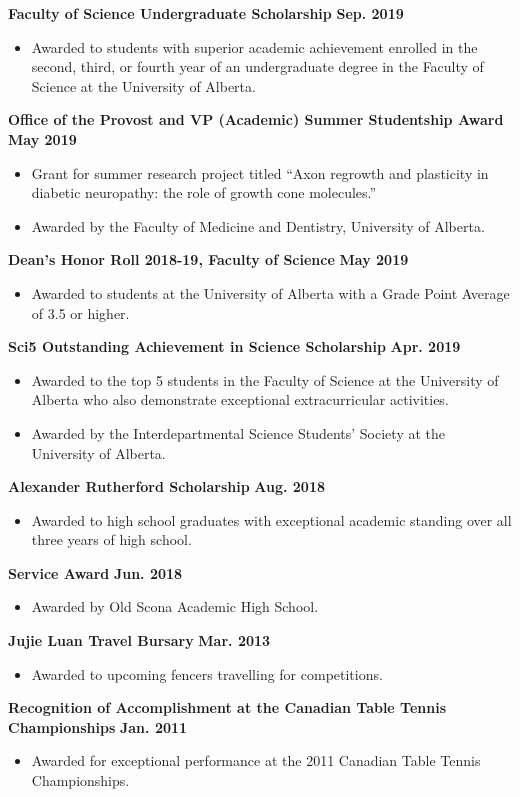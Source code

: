 \documentclass{article}
\begin{document}
    \textbf{Faculty of Science Undergraduate Scholarship} \hfill \textbf{Sep. 2019}
        \begin{itemize}
            \item Awarded to students with superior academic achievement enrolled in the second, third, or fourth year of an undergraduate degree in the Faculty of Science at the University of Alberta.
        \end{itemize}
    \textbf{Office of the Provost and VP (Academic) Summer Studentship Award} \hfill \textbf{May 2019}
        \begin{itemize}
            \item Grant for summer research project titled ``Axon regrowth and plasticity in diabetic neuropathy: the role of growth cone molecules.''
            \item Awarded by the Faculty of Medicine and Dentistry, University of Alberta.
        \end{itemize}
    \textbf{Dean's Honor Roll 2018-19, Faculty of Science} \hfill \textbf{May 2019}
        \begin{itemize}
            \item Awarded to students at the University of Alberta with a Grade Point Average of 3.5 or higher.
        \end{itemize}
    \textbf{Sci5 Outstanding Achievement in Science Scholarship} \hfill \textbf{Apr. 2019}
        \begin{itemize}
            \item Awarded to the top 5 students in the Faculty of Science at the University of Alberta who also demonstrate exceptional extracurricular activities.
            \item Awarded by the Interdepartmental Science Students' Society at the University of Alberta.
        \end{itemize}
    \textbf{Alexander Rutherford Scholarship} \hfill \textbf{Aug. 2018}
        \begin{itemize}
            \item Awarded to high school graduates with exceptional academic standing over all three years of high school.
        \end{itemize}
    \textbf{Service Award} \hfill \textbf{Jun. 2018}
        \begin{itemize}
            \item Awarded by Old Scona Academic High School.
        \end{itemize}
    \textbf{Jujie Luan Travel Bursary} \hfill \textbf{Mar. 2013}
        \begin{itemize}
            \item Awarded to upcoming fencers travelling for competitions.
        \end{itemize}
    \textbf{Recognition of Accomplishment at the Canadian Table Tennis Championships} \hfill \textbf{Jan. 2011}
        \begin{itemize}
            \item Awarded for exceptional performance at the 2011 Canadian Table Tennis Championships.
        \end{itemize}
\end{document}
